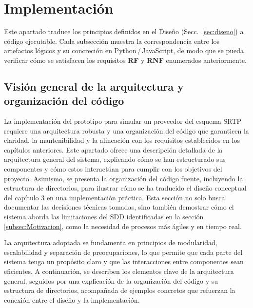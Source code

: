 \chapter{Implementación}
\label{sec:implementacion}

Este apartado traduce los principios definidos en el Diseño (Secc.~\ref{sec:diseno}) a código ejecutable. Cada subsección muestra la correspondencia entre los artefactos lógicos y su concreción en Python\,/\,JavaScript, de modo que se pueda verificar cómo se satisfacen los requisitos \textbf{RF} y \textbf{RNF} enumerados anteriormente.

\section{Visión general de la arquitectura y organización del código}
\label{sec:impl-vision}

\noindent
La implementación del prototipo para simular un proveedor del esquema SRTP requiere una arquitectura robusta y una organización del código que garanticen la claridad, la mantenibilidad y la alineación con los requisitos establecidos en los capítulos anteriores. Este apartado ofrece una descripción detallada de la arquitectura general del sistema, explicando cómo se han estructurado sus componentes y cómo estos interactúan para cumplir con los objetivos del proyecto. Asimismo, se presenta la organización del código fuente, incluyendo la estructura de directorios, para ilustrar cómo se ha traducido el diseño conceptual del capítulo 3 en una implementación práctica. Esta sección no solo busca documentar las decisiones técnicas tomadas, sino también demostrar cómo el sistema aborda las limitaciones del SDD identificadas en la sección \ref{subsec:Motivacion}, como la necesidad de procesos más ágiles y en tiempo real.

La arquitectura adoptada se fundamenta en principios de modularidad, escalabilidad y separación de preocupaciones, lo que permite que cada parte del sistema tenga un propósito claro y que las interacciones entre componentes sean eficientes. A continuación, se describen los elementos clave de la arquitectura general, seguidos por una explicación de la organización del código y su estructura de directorios, acompañada de ejemplos concretos que refuerzan la conexión entre el diseño y la implementación.

